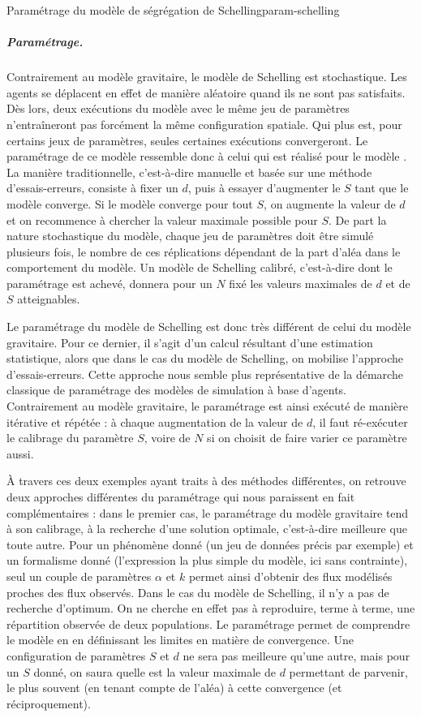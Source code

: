 \begin{encadre}{Paramétrage du modèle de ségrégation de Schelling}{param-schelling}
\subparagraph{Paramétrage.}
Contrairement au modèle gravitaire, le modèle de Schelling est stochastique.
Les agents se déplacent en effet de manière aléatoire quand ils ne sont pas satisfaits.
Dès lors, deux exécutions du modèle avec le même jeu de paramètres n'entraîneront pas forcément la même configuration spatiale.
Qui plus est, pour certains jeux de paramètres, seules certaines exécutions convergeront.
Le paramétrage de ce modèle ressemble donc à celui qui est réalisé pour le modèle \simfeodal{}.
La manière \og traditionnelle\fg{}, c'est-à-dire manuelle et basée sur une méthode d'essais-erreurs, consiste à fixer un $d$, puis à essayer d'augmenter le $S$ tant que le modèle converge.
Si le modèle converge pour tout $S$, on augmente la valeur de $d$ et on recommence à chercher la valeur maximale possible pour $S$.
De part la nature stochastique du modèle, chaque jeu de paramètres doit être simulé plusieurs fois, le nombre de ces réplications dépendant de la part d'aléa dans le comportement du modèle.
Un modèle de Schelling calibré, c'est-à-dire dont le paramétrage est achevé,
donnera pour un $N$ fixé les valeurs maximales de $d$ et de $S$ atteignables.
\end{encadre}

Le paramétrage du modèle de Schelling est donc très différent de celui du modèle gravitaire.
Pour ce dernier, il s'agit d'un calcul résultant d'une estimation statistique, alors que dans le cas du modèle de Schelling, on mobilise l'approche d'essais-erreurs.
Cette approche nous semble plus représentative de la démarche classique de paramétrage des modèles de simulation à base d'agents.
Contrairement au modèle gravitaire, le paramétrage est ainsi exécuté de manière itérative et répétée : à chaque augmentation de la valeur de $d$, il faut ré-exécuter le calibrage du paramètre $S$, voire de $N$ si on choisit de faire varier ce paramètre aussi.


À travers ces deux exemples ayant traits à des méthodes différentes, on retrouve deux approches différentes du paramétrage qui nous paraissent en fait complémentaires :
	dans le premier cas, le paramétrage du modèle gravitaire tend à son calibrage, à la recherche d'une solution optimale, c'est-à-dire meilleure que toute autre.
Pour un phénomène donné (un jeu de données précis par exemple) et un formalisme donné (l'expression la plus simple du modèle, ici sans contrainte), seul un couple de paramètres $\alpha$ et $k$ permet ainsi d'obtenir des flux modélisés proches des flux observés.
Dans le cas du modèle de Schelling, il n'y a pas de recherche d'optimum.
On ne cherche en effet pas à reproduire, terme à terme, une répartition observée de deux populations.
Le paramétrage permet de comprendre le modèle en en définissant les limites en matière de convergence.
Une configuration de paramètres $S$ et $d$ ne sera pas meilleure qu'une autre, mais pour un $S$ donné, on saura quelle est la valeur maximale de $d$ permettant de parvenir, le plus souvent (en tenant compte de l'aléa) à cette convergence (et réciproquement).

